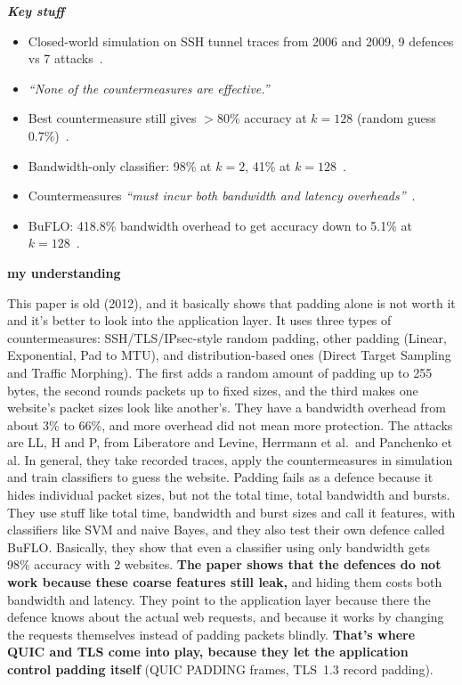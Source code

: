 \textbf{\textit{Key stuff}}
\begin{itemize}
    \item Closed-world simulation on SSH tunnel traces from 2006 and 2009, 9 defences vs 7 attacks~\cite[p.~332]{dyer2012peekaboo}.
    \item \textit{``None of the countermeasures are effective.''}~\cite[p.~332]{dyer2012peekaboo}
    \item Best countermeasure still gives $>$80\% accuracy at $k=128$ (random guess 0.7\%)~\cite[p.~332]{dyer2012peekaboo}.
    \item Bandwidth-only classifier: 98\% at $k=2$, 41\% at $k=128$~\cite[p.~333]{dyer2012peekaboo}.
    \item Countermeasures \textit{``must incur both bandwidth and latency overheads''}~\cite[p.~341]{dyer2012peekaboo}.
    \item BuFLO: 418.8\% bandwidth overhead to get accuracy down to 5.1\% at $k=128$~\cite[p.~343]{dyer2012peekaboo}.
\end{itemize}

\textbf{my understanding}

This paper is old (2012), and it basically shows that padding alone is not worth it and it's better to look into the application layer. It uses three types of countermeasures: SSH/TLS/IPsec-style random padding, other padding (Linear, Exponential, Pad to MTU), and distribution-based ones (Direct Target Sampling and Traffic Morphing). The first adds a random amount of padding up to 255 bytes, the second rounds packets up to fixed sizes, and the third makes one website's packet sizes look like another's. They have a bandwidth overhead from about 3\% to 66\%, and more overhead did not mean more protection. The attacks are LL, H and P, from Liberatore and Levine, Herrmann et al.\ and Panchenko et al. In general, they take recorded traces, apply the countermeasures in simulation and train classifiers to guess the website. Padding fails as a defence because it hides individual packet sizes, but not the total time, total bandwidth and bursts. They use stuff like total time, bandwidth and burst sizes and call it features, with classifiers like SVM and naive Bayes, and they also test their own defence called BuFLO. Basically, they show that even a classifier using only bandwidth gets 98\% accuracy with 2 websites. \textbf{The paper shows that the defences do not work because these coarse features still leak,} and hiding them costs both bandwidth and latency. They point to the application layer because there the defence knows about the actual web requests, and because it works by changing the requests themselves instead of padding packets blindly. \textbf{That's where QUIC and TLS come into play, because they let the application control padding itself} (QUIC PADDING frames, TLS~1.3 record padding).

